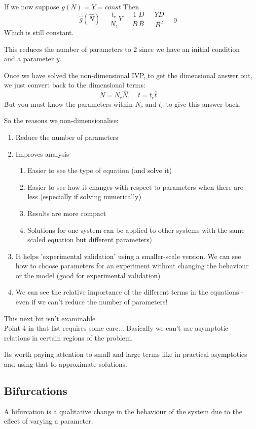\documentclass{/home/janmebows/Documents/LatexTemplates/myassignment}
\begin{document}
If we now suppose $g(N) = Y = const$
Then
\[\hat{g}(\hat{N}) = \frac{t_c}{N_c} Y = \frac1B \frac DB = \frac{YD}{B^2} = y\]
Which is still constant.


This reduces the number of parameters to $2$ since we have an initial condition and a parameter $y$.

Once we have solved the non-dimensional IVP, to get the dimensional answer out, we just convert back to the dimensional terms:
\[N = N_c \hat{N},\quad t=t_c \hat{t}\]
But you must know the parameters within $N_c$ and $t_c$ to give this answer back.

So the reasons we non-dimensionalise:
\begin{enumerate}
    \item Reduce the number of parameters
    \item Improves analysis
    \begin{enumerate}
        \item Easier to see the type of equation (and solve it)
        \item Easier to see how it changes with respect to parameters when there are less (especially if solving numerically)
        \item Results are more compact
        \item Solutions for one system can be applied to other systems with the same scaled equation but different parameters)
    \end{enumerate}
    \item It helps 'experimental validation' using a smaller-scale version. We can see how to choose parameters for an experiment without changing the behaviour or the model (good for experimental validation)
    \item We can see the relative importance of the different terms in the equations - even if we can't reduce the number of parameters!
\end{enumerate}

This next bit isn't examinable\\
Point $4$ in that list requires some care... 
Basically we can't use asymptotic relations in certain regions of the problem.


Its worth paying attention to small and large terms like in practical asymptotics and using that to approximate solutions.


\subsection{Bifurcations}
A bifurcation is a qualitative change in the behaviour of the system due to the effect of varying a parameter.
\end{document}
